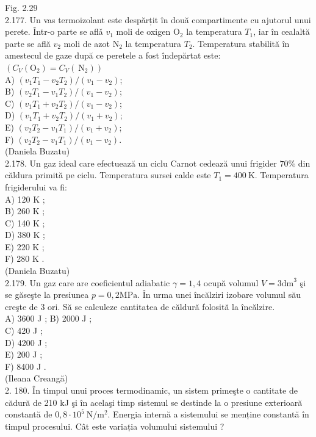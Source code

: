 \documentclass[10pt]{article}
\begin{document}
Fig. 2.29\\
2.177. Un vas termoizolant este despărțit în două compartimente cu ajutorul unui perete. Într-o parte se aflǎ $v_{1}$ moli de oxigen $\mathrm{O}_{2}$ la temperatura $T_{1}$, iar în cealaltă parte se află $v_{2}$ moli de azot $\mathrm{N}_{2}$ la temperatura $T_{2}$. Temperatura stabilită în amestecul de gaze după ce peretele a fost îndepărtat este: $\left(C_{V}\left(\mathrm{O}_{2}\right)=C_{V}\left(\mathrm{~N}_{2}\right)\right)$\\
A) $\left(v_{1} T_{1}-v_{2} T_{2}\right) /\left(v_{1}-v_{2}\right)$;\\
B) $\left(v_{2} T_{1}-v_{1} T_{2}\right) /\left(v_{1}-v_{2}\right)$;\\
C) $\left(v_{1} T_{1}+v_{2} T_{2}\right) /\left(v_{1}-v_{2}\right)$;\\
D) $\left(v_{1} T_{1}+v_{2} T_{2}\right) /\left(v_{1}+v_{2}\right)$;\\
E) $\left(v_{2} T_{2}-v_{1} T_{1}\right) /\left(v_{1}+v_{2}\right)$;\\
F) $\left(v_{2} T_{2}-v_{1} T_{1}\right) /\left(v_{1}-v_{2}\right)$.\\
(Daniela Buzatu)\\
2.178. Un gaz ideal care efectuează un ciclu Carnot cedează unui frigider $70 \%$ din căldura primită pe ciclu. Temperatura sursei calde este $T_{1}=400 \mathrm{~K}$. Temperatura frigiderului va fi:\\
A) 120 K ;\\
B) 260 K ;\\
C) 140 K ;\\
D) 380 K ;\\
E) 220 K ;\\
F) 280 K .\\
(Daniela Buzatu)\\
2.179. Un gaz care are coeficientul adiabatic $\gamma=1,4$ ocupă volumul $V=3 \mathrm{dm}^{3}$ şi se găseşte la presiunea $p=0,2 \mathrm{MPa}$. În urma unei încălziri izobare volumul său creşte de 3 ori. Să se calculeze cantitatea de căldură folosită la încălzire.\\
A) 3600 J ; B) 2000 J ;\\
C) 420 J ;\\
D) 4200 J ;\\
E) 200 J ;\\
F) 8400 J .\\
(Ileana Creangă)\\
2. 180. În timpul unui proces termodinamic, un sistem primeşte o cantitate de cădură de 210 kJ şi în acelaşi timp sistemul se destinde la o presiune exterioară constantă de $0,8 \cdot 10^{5} \mathrm{~N} / \mathrm{m}^{2}$. Energia internă a sistemului se menține constantă în timpul procesului. Cât este variația volumului sistemului ?\\
\end{document}
